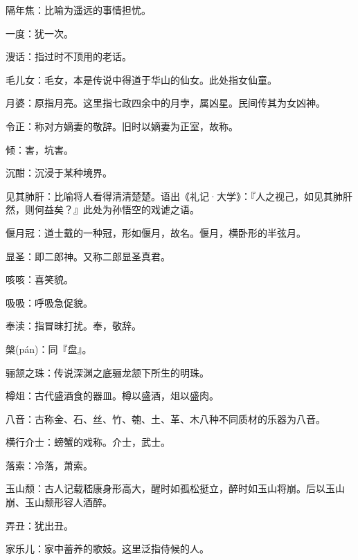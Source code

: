 \startbuffer[1751]
隔年焦：比喻为遥远的事情担忧。
\stopbuffer


\startbuffer[1752]
一度：犹一次。
\stopbuffer


\startbuffer[1753]
溲话：指过时不顶用的老话。
\stopbuffer


\startbuffer[1754]
毛儿女：毛女，本是传说中得道于华山的仙女。此处指女仙童。
\stopbuffer


\startbuffer[1755]
月婆：原指月亮。这里指七政四余中的月孛，属凶星。民间传其为女凶神。
\stopbuffer


\startbuffer[1756]
令正：称对方嫡妻的敬辞。旧时以嫡妻为正室，故称。
\stopbuffer


\startbuffer[1757]
倾：害，坑害。
\stopbuffer


\startbuffer[1758]
沉酣：沉浸于某种境界。
\stopbuffer


\startbuffer[1759]
见其肺肝：比喻将人看得清清楚楚。语出《礼记·大学》：『人之视己，如见其肺肝然，则何益矣？』此处为孙悟空的戏谑之语。
\stopbuffer


\startbuffer[1760]
偃月冠：道士戴的一种冠，形如偃月，故名。偃月，横卧形的半弦月。
\stopbuffer


\startbuffer[1761]
显圣：即二郎神。又称二郎显圣真君。
\stopbuffer


\startbuffer[1762]
咳咳：喜笑貌。
\stopbuffer


\startbuffer[1763]
吸吸：呼吸急促貌。
\stopbuffer


\startbuffer[1764]
奉渎：指冒昧打扰。奉，敬辞。
\stopbuffer


\startbuffer[1765]
槃(pán)：同『盘』。
\stopbuffer


\startbuffer[1766]
骊颔之珠：传说深渊之底骊龙颔下所生的明珠。
\stopbuffer


\startbuffer[1767]
樽俎：古代盛酒食的器皿。樽以盛酒，俎以盛肉。
\stopbuffer


\startbuffer[1768]
八音：古称金、石、丝、竹、匏、土、革、木八种不同质材的乐器为八音。
\stopbuffer


\startbuffer[1769]
横行介士：螃蟹的戏称。介士，武士。
\stopbuffer


\startbuffer[1770]
落索：冷落，萧索。
\stopbuffer


\startbuffer[1771]
玉山颓：古人记载嵇康身形高大，醒时如孤松挺立，醉时如玉山将崩。后以玉山崩、玉山颓形容人酒醉。
\stopbuffer


\startbuffer[1772]
弄丑：犹出丑。
\stopbuffer


\startbuffer[1773]
家乐儿：家中蓄养的歌妓。这里泛指侍候的人。
\stopbuffer


